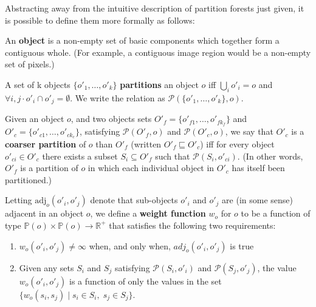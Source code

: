 Abstracting away from the intuitive description of partition forests just given, it is possible to define them more formally as follows:

\begin{definition}
An \textbf{object} is a non-empty set of basic components which together form a contiguous whole. (For example, a contiguous image region would be a non-empty set of pixels.)
\end{definition}

\begin{definition}
A set of k objects $\{o'_1,\ldots,o'_k\}$ \textbf{partitions} an object $o$ iff $\bigcup_i o'_i = o$ and $\forall i,j \cdot o'_i \cap o'_j = \emptyset$. We write the relation as $\mathcal{P}(\{o'_1,\ldots,o'_k\}, o)$.
\end{definition}

\begin{definition}
Given an object $o$, and two objects sets $O'_f = \{o'_{f1},\ldots,o'_{fk_f}\}$ and $O'_c = \{o'_{c1},\ldots,o'_{ck_c}\}$, satisfying $\mathcal{P}(O'_f,o)$ and $\mathcal{P}(O'_c,o)$, we say that $O'_c$ is a \textbf{coarser partition} of $o$ than $O'_f$ (written $O'_f \sqsubseteq O'_c$) iff for every object $o'_{ci} \in O'_c$ there exists a subset $S_i \subseteq O'_f$ such that $\mathcal{P}(S_i,o'_{ci})$. (In other words, $O'_f$ is a partition of $o$ in which each individual object in $O'_c$ has itself been partitioned.)
\end{definition}

\begin{definition}
Letting $\mbox{adj}_o(o'_i, o'_j)$ denote that sub-objects $o'_i$ and $o'_j$ are (in some sense) adjacent in an object $o$, we define a \textbf{weight function} $w_o$ for $o$ to be a function of type $\mathbb{P}(o) \times \mathbb{P}(o) \to \mathbb{R}^+$ that satisfies the following two requirements:
%
\begin{enumerate}

\item $w_o(o'_i, o'_j) \ne \infty$ when, and only when, $adj_o(o'_i, o'_j)$ is true

\item Given any sets $S_i$ and $S_j$ satisfying $\mathcal{P}(S_i,o'_i)$ and $\mathcal{P}(S_j,o'_j)$, the value $w_o(o'_i, o'_j)$ is a function of only the values in the set $\{w_o(s_i, s_j) \; | \; s_i \in S_i, \; s_j \in S_j\}$.

\end{enumerate}

\end{definition}

